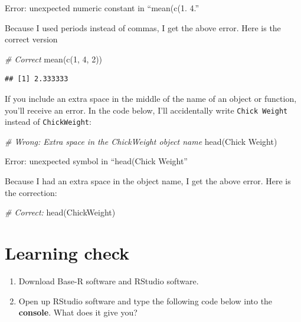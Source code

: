 \documentclass[
]{book}
\newenvironment{Shaded}{\begin{snugshade}}{\end{snugshade}}
\newcommand{\CommentTok}[1]{\textcolor[rgb]{0.56,0.35,0.01}{\textit{#1}}}
\newcommand{\DecValTok}[1]{\textcolor[rgb]{0.00,0.00,0.81}{#1}}
\newcommand{\FunctionTok}[1]{\textcolor[rgb]{0.00,0.00,0.00}{#1}}
\newcommand{\NormalTok}[1]{#1}
\begin{document}
Error: unexpected numeric constant in ``mean(c(1. 4.''

Because I used periods instead of commas, I get the above error. Here is the correct version

\begin{Shaded}
\begin{Highlighting}[]
\CommentTok{\# Correct}
\FunctionTok{mean}\NormalTok{(}\FunctionTok{c}\NormalTok{(}\DecValTok{1}\NormalTok{, }\DecValTok{4}\NormalTok{, }\DecValTok{2}\NormalTok{))}
\end{Highlighting}
\end{Shaded}

\begin{verbatim}
## [1] 2.333333
\end{verbatim}

If you include an extra space in the middle of the name of an object or function, you'll receive an error. In the code below, I'll accidentally write \texttt{Chick\ Weight} instead of \texttt{ChickWeight}:

\begin{Shaded}
\begin{Highlighting}[]
\CommentTok{\# Wrong: Extra space in the ChickWeight object name}
\FunctionTok{head}\NormalTok{(Chick Weight)}
\end{Highlighting}
\end{Shaded}

Error: unexpected symbol in ``head(Chick Weight''

Because I had an extra space in the object name, I get the above error. Here is the correction:

\begin{Shaded}
\begin{Highlighting}[]
\CommentTok{\# Correct:}
\FunctionTok{head}\NormalTok{(ChickWeight)}
\end{Highlighting}
\end{Shaded}

\hypertarget{INSTALL-LEARNING-CHECK}{%
\section{Learning check}\label{INSTALL-LEARNING-CHECK}}

\begin{enumerate}
\def\labelenumi{\arabic{enumi}.}
\item
  Download Base-R software and RStudio software.
\item
  Open up RStudio software and type the following code below into the \textbf{console}. What does it give you?
\end{enumerate}
\end{document}
